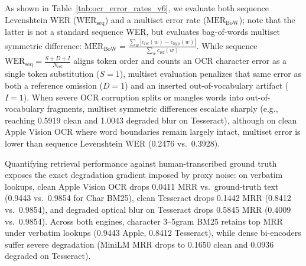 \documentclass[conference]{IEEEtran}
\begin{document}
As shown in Table~\ref{tab:ocr_error_rates_v6}, we evaluate both sequence Levenshtein WER ($\text{WER}_{\text{seq}}$) and a multiset error rate ($\text{MER}_{\text{BoW}}$); note that the latter is not a standard sequence WER, but evaluates bag-of-words multiset symmetric difference: $\text{MER}_{\text{BoW}} = \frac{\sum_w |c_{\text{ref}}(w) - c_{\text{hyp}}(w)|}{\sum_w c_{\text{ref}}(w)}$. While sequence $\text{WER}_{\text{seq}} = \frac{S + D + I}{N_{\text{ref}}}$ aligns token order and counts an OCR character error as a single token substitution ($S=1$), multiset evaluation penalizes that same error as both a reference omission ($D=1$) and an inserted out-of-vocabulary artifact ($I=1$). When severe OCR corruption splits or mangles words into out-of-vocabulary fragments, multiset symmetric differences escalate sharply (e.g., reaching 0.5919 clean and 1.0043 degraded blur on Tesseract), although on clean Apple Vision OCR where word boundaries remain largely intact, multiset error is lower than sequence Levenshtein WER (0.2476 vs.\ 0.3928).

Quantifying retrieval performance against human-transcribed ground truth exposes the exact degradation gradient imposed by proxy noise: on verbatim lookups, clean Apple Vision OCR drops 0.0411 MRR vs.\ ground-truth text (0.9443 vs.\ 0.9854 for Char BM25), clean Tesseract drops 0.1442 MRR (0.8412 vs.\ 0.9854), and degraded optical blur on Tesseract drops 0.5845 MRR (0.4009 vs.\ 0.9854). Across both engines, character 3--5gram BM25 retains top MRR under verbatim lookups (0.9443 Apple, 0.8412 Tesseract), while dense bi-encoders suffer severe degradation (MiniLM MRR drops to 0.1650 clean and 0.0936 degraded on Tesseract).

\begin{table}[t]
\centering\small
\caption{Standardized JiWER OCR Error Rates on SROIE Receipts ($N=626$). Multiset Error Rate evaluates bag-of-words symmetric difference (non-standard sequence WER).}\label{tab:ocr_error_rates_v6}
\end{table}
\end{document}
